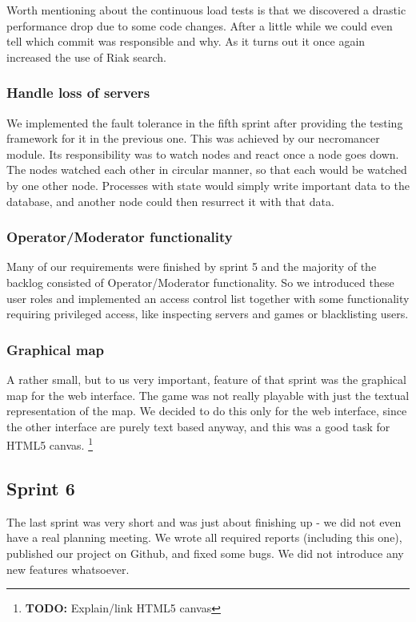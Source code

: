 \documentclass[11pt,a4paper]{report}
\newcommand{\todo}[1]{\footnote{{\color{red} {\bf TODO:} #1}}}
\begin{document}
Worth mentioning about the continuous load tests is that we discovered a drastic
performance drop due to some code changes. After a little while we could even
tell which commit was responsible and why. As it turns out it once again
increased the use of Riak search.

\subsubsection{Handle loss of servers}
We implemented the fault tolerance in the fifth sprint after providing the
testing framework for it in the previous one. This was achieved by our
necromancer module. Its responsibility was to watch nodes and react once a node
goes down. The nodes watched each other in circular manner, so that each would
be watched by one other node. Processes with state would simply write important
data to the database, and another node could then resurrect it with that data.

\subsubsection{Operator/Moderator functionality}
Many of our requirements were finished by sprint 5 and the majority of the
backlog consisted of Operator/Moderator functionality. So we introduced these
user roles and implemented an access control list together with some
functionality requiring privileged access, like inspecting servers and games or
blacklisting users.

\subsubsection{Graphical map}
A rather small, but to us very important, feature of that sprint was the
graphical map for the web interface. The game was not really playable with just
the textual representation of the map. We decided to do this only for the web
interface, since the other interface are purely text based anyway, and this was
a good task for HTML5 canvas.
\todo{Explain/link HTML5 canvas}
\subsection*{Sprint 6}
The last sprint was very short and was just about finishing up - we did not even
have a real planning meeting. We wrote all required reports (including this
one), published our project on Github, and fixed some bugs. We did not
introduce any new features whatsoever.
\end{document}
